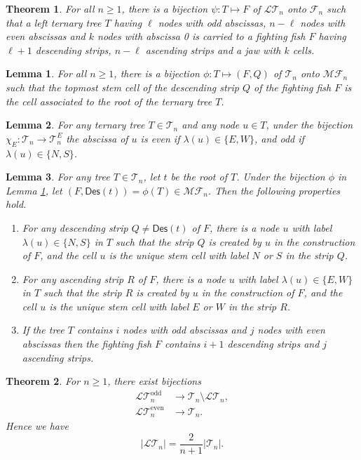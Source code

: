 \documentclass[10pt,a4paper]{amsart}
\newtheorem{thm}{Theorem}
\newtheorem{lem}{Lemma}
\newcommand{\Des}{{\textsf{Des}}}
\newcommand{\F}{{\mathcal{F}}}
\newcommand{\LT}{{\mathcal{LT}}}
\newcommand{\MF}{{\mathcal{MF}}}
\newcommand{\T}{{\mathcal{T}}}
\newcommand{\even}{{\textrm{even}}}
\newcommand{\odd}{{\textrm{odd}}}
\begin{document}
\begin{thm} \label{thm:LTT-to-fish-bijection}
For all $n\ge 1$, there is a bijection $\psi: T\mapsto F$ of $\LT_n$ onto $\F_n$ such that a left ternary tree $T$ having $\ell$ nodes with odd abscissas, $n-\ell$ nodes with even abscissas and $k$ nodes with abscissa 0 is carried to a fighting fish $F$ having $\ell+1$ descending strips, $n-\ell$ ascending strips and a jaw with $k$ cells.
\end{thm}

\begin{lem} \label{lem:the-map-phi}
For all $n\ge 1$, there is a bijection $\phi: T\mapsto (F,Q)$ of $\T_n$ onto $\MF_n$ such that the topmost stem cell of the descending strip $Q$ of the fighting fish $F$ is the cell associated to the root of the ternary tree $T$. 
\end{lem}

\begin{lem} \label{lem:v-labeling-rule} For any ternary tree $T\in\T_n$ and any node $u\in T$, under the bijection $\chi_E:\T_n\rightarrow\T^E_n$ the abscissa of $u$ is even if $\lambda(u)\in\{E,W\}$, and odd if $\lambda(u)\in\{N,S\}$.
\end{lem}

\begin{lem}  \label{lem:unique-stem-cell-in-strips}
For any tree $T\in\T_n$, let $t$ be the root of $T$. Under the bijection $\phi$ in Lemma \ref{lem:the-map-phi}, let $(F,\Des(t))=\phi(T)\in\MF_n$. Then the following properties hold.
\begin{enumerate}
\item For any descending strip $Q\neq \Des(t)$ of $F$, there is a node $u$ with label $\lambda(u)\in\{N,S\}$ in $T$ such that the strip $Q$ is created by $u$ in the construction of $F$, and the cell $u$ is the unique stem cell with label $N$ or $S$ in the strip $Q$.
\item For any ascending strip $R$ of $F$, there is a node $u$ with label $\lambda(u)\in\{E,W\}$ in $T$ such that the strip $R$ is created by $u$ in the construction of $F$, and the cell $u$ is the unique stem cell with label $E$ or $W$ in the strip $R$.
\item If the tree $T$ contains $i$ nodes with odd abscissas and $j$ nodes with even abscissas then the fighting fish $F$ contains $i+1$ descending strips and $j$ ascending strips.
\end{enumerate}
\end{lem}

\begin{thm} \label{thm:enumeration}
For $n\ge 1$, there exist bijections
\begin{align}
\LT_n^{\odd} & \rightarrow \T_n\setminus \LT_n,  \label{eqn:LT_odd}\\
\LT_n^{\even}& \rightarrow \T_n. \label{eqn:LT_even}
\end{align}
Hence we have 
\begin{equation*}
|\LT_n| =\frac{2}{n+1} |\T_n|.
\end{equation*}
\end{thm}
\end{document}
